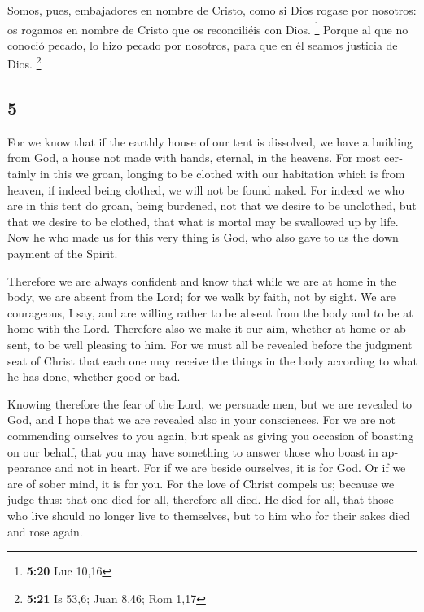 \begin{paracol}{2}
 Somos, pues, embajadores en nombre de Cristo, como si
Dios rogase por nosotros: os rogamos en nombre de Cristo que os
reconciliéis con Dios. \footnote{\textbf{5:20} Luc 10,16}
 Porque al que no conoció pecado, lo hizo pecado por
nosotros, para que en él seamos justicia de Dios. \footnote{\textbf{5:21}
  Is 53,6; Juan 8,46; Rom 1,17}

\switchcolumn
\begin{otherlanguage}{english}

\hypertarget{section-9}{%
\section{5}\label{section-9}}

 For we know that if the earthly house of our tent is
dissolved, we have a building from God, a house not made with hands,
eternal, in the heavens.  For most certainly in this we
groan, longing to be clothed with our habitation which is from heaven,
 if indeed being clothed, we will not be found naked.
 For indeed we who are in this tent do groan, being
burdened, not that we desire to be unclothed, but that we desire to be
clothed, that what is mortal may be swallowed up by life. 
Now he who made us for this very thing is God, who also gave to us the
down payment of the Spirit.

 Therefore we are always confident and know that while we
are at home in the body, we are absent from the Lord;  for
we walk by faith, not by sight.  We are courageous, I say,
and are willing rather to be absent from the body and to be at home with
the Lord.  Therefore also we make it our aim, whether at
home or absent, to be well pleasing to him.  For we must
all be revealed before the judgment seat of Christ that each one may
receive the things in the body according to what he has done, whether
good or bad.

 Knowing therefore the fear of the Lord, we persuade men,
but we are revealed to God, and I hope that we are revealed also in your
consciences.  For we are not commending ourselves to you
again, but speak as giving you occasion of boasting on our behalf, that
you may have something to answer those who boast in appearance and not
in heart.  For if we are beside ourselves, it is for God.
Or if we are of sober mind, it is for you.  For the love
of Christ compels us; because we judge thus: that one died for all,
therefore all died.  He died for all, that those who live
should no longer live to themselves, but to him who for their sakes died
and rose again.


\end{otherlanguage}
\end{paracol}
